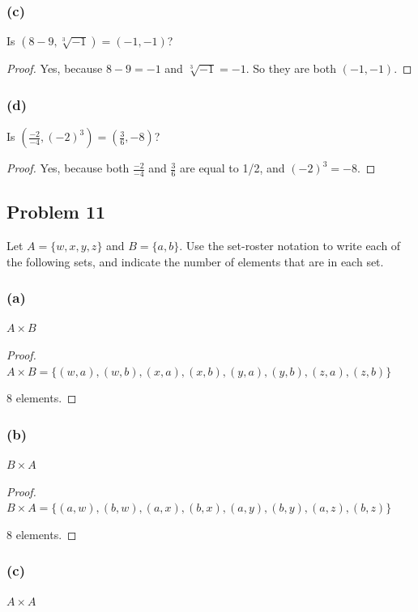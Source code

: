 \documentclass[14pt]{extarticle}
\begin{document}
\subsubsection{(c)}
Is $(8 - 9, \sqrt[3]{-1}) = (-1, -1)$?

\begin{proof}
Yes, because $8 - 9 = -1$ and $\sqrt[3]{-1} = -1$. So they are both $(-1, -1)$.
\end{proof}

\subsubsection{(d)}
Is $(\frac{-2}{-4}, (-2)^3) = (\frac{3}{6}, -8)$?

\begin{proof}
Yes, because both $\frac{-2}{-4}$ and $\frac{3}{6}$ are equal to 1/2, and
$(-2)^3 = -8$.
\end{proof}

\subsection{Problem 11}
Let $A = \{w, x, y, z\}$ and $B = \{a, b\}$. Use the set-roster notation to
write each of the following sets, and indicate the number of elements that are
in each set.

\subsubsection{(a)}
$A \times B$

\begin{proof}
$A \times B = \{(w, a), (w, b), (x, a), (x, b), (y, a), (y, b), (z, a), (z, b)\}$

8 elements.
\end{proof}

\subsubsection{(b)}
$B \times A$

\begin{proof}
$B \times A = \{(a, w), (b, w), (a, x), (b, x), (a, y), (b, y), (a, z), (b, z)\}$

8 elements.
\end{proof}

\subsubsection{(c)}
$A \times A$
\end{document}
